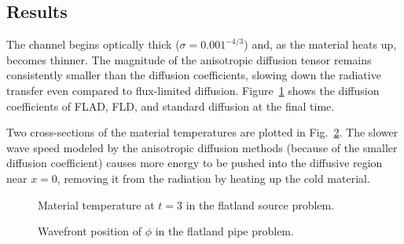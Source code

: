 \subsection{Results}

The channel begins optically thick ($\sigma=0.001^{-4/3}$) and, as the material
heats up, becomes thinner. The magnitude of the anisotropic diffusion tensor
remains consistently smaller than the diffusion coefficients, slowing down the
radiative transfer even compared to flux-limited diffusion.
Figure~\ref{fig:crashaltDcoeff} shows the diffusion coefficients of FLAD, FLD,
and standard diffusion at the final time.

\begin{figure}[htb]
  \centering\small
  \label{fig:crashaltDcoeff}
\end{figure}

Two cross-sections of the material temperatures are plotted in
Fig.~\ref{fig:crashaltMattemp}. The slower wave speed modeled by the anisotropic
diffusion methods (because of the smaller diffusion coefficient) causes more
energy to be pushed into the diffusive region near $x=0$, removing it from the
radiation by heating up the cold material. 


\begin{figure}[htb]
  \centering\small
  \caption{Material temperature at $t=3$ in the flatland source problem.}
  \label{fig:crashaltMattemp}
\end{figure}

\begin{figure}[htb]
  \centering\small
  
  \caption{Wavefront position of $\phi$ in the flatland pipe problem.}
  \label{fig:crashaltWavefront}
\end{figure}


